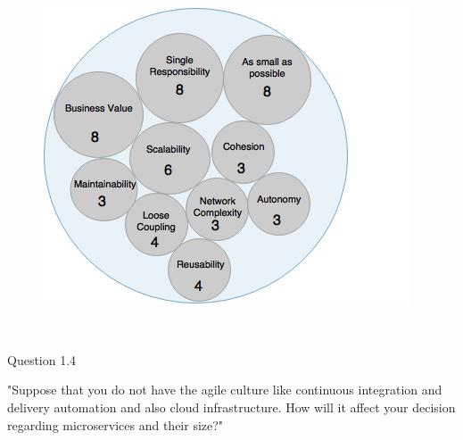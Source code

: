 \\
\begin{figure}[H]
\begin{center}
\includegraphics[scale=0.5]{figures/question1_3}
\label{fig:hybris_architecture/interview/question1-3}
\end{center}
\end{figure}
\\
\begin{shaded} Question 1.4 \end{shaded} \label{question:hybris_architecture/interview/question_1.4}
"Suppose that you do not have the agile culture like continuous integration and delivery automation and also cloud infrastructure. How will it affect your decision regarding microservices and their size?"\\
